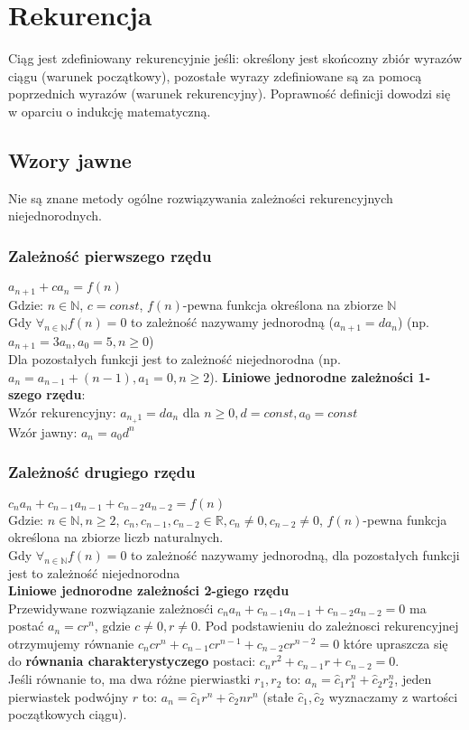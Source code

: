 \documentclass[a4paper,12pt]{article}
\begin{document}
\section{Rekurencja}
Ciąg jest zdefiniowany rekurencyjnie jeśli: określony jest skońcozny zbiór wyrazów ciągu (warunek początkowy), pozostałe wyrazy zdefiniowane są za pomocą poprzednich wyrazów (warunek rekurencyjny). Poprawność definicji dowodzi się w oparciu o indukcję matematyczną.
\subsection{Wzory jawne}
Nie są znane metody ogólne rozwiązywania zależności rekurencyjnych niejednorodnych.
\subsubsection{Zależność pierwszego rzędu}
$a_{n+1}+ca_n=f(n)$ \\
Gdzie: $n\in\mathbb{N}$, $c=const$, $f(n)$-pewna funkcja określona na zbiorze $\mathbb{N}$\\
Gdy $\forall_{n \in\mathbb{N}}f(n)=0$ to zależność nazywamy jednorodną ($a_{n+1}=da_n$) (np. $a_{n+1}=3a_n,  a_0=5, n\geq0$) \\
Dla pozostałych funkcji jest to zależność niejednorodna (np. $a_n=a_{n-1}+(n-1), a_1=0, n\geq2$).
\textbf{Liniowe jednorodne zależności 1-szego rzędu}: \\
Wzór rekurencyjny: $a_{n_+1}=da_n$ dla $n\geq0, d=const, a_0=const$ \\
Wzór jawny: $a_n=a_0d^n$
\subsubsection{Zależność drugiego rzędu}
$c_na_n+c_{n-1}a_{n-1}+c_{n-2}a_{n-2}=f(n)$\\
Gdzie: $n\in\mathbb{N}, n\geq2$, $c_n,c_{n-1}, c_{n-2}\in\mathbb{R}, c_n\neq0, c_{n-2}\neq0$, $f(n)$-pewna funkcja określona na zbiorze liczb naturalnych.\\
Gdy $\forall_{n \in\mathbb{N}}f(n)=0$ to zależność nazywamy jednorodną, dla pozostałych funkcji  jest to zależność niejednorodna \\
\textbf{Liniowe jednorodne zależności 2-giego rzędu}\\
Przewidywane rozwiązanie zależnosći $c_na_n+c_{n-1}a_{n-1}+c_{n-2}a_{n-2}=0$ ma postać $a_n=cr^n$, gdzie $c\neq0, r\neq0$. Pod podstawieniu do zależnosci rekurencyjnej otrzymujemy równanie $c_ncr^n+c_{n-1}cr^{n-1}+c_{n-2}cr^{n-2}=0$ które upraszcza się do \textbf{równania charakterystyczego} postaci: $c_nr^2+c_{n-1}r+c_{n-2}=0$.\\
Jeśli równanie to, ma dwa różne pierwiastki $r_1, r_2$ to: $a_n=\hat c_1r_1^n+\hat c_2r_2^n$, jeden pierwiastek podwójny $r$ to: $a_n=\hat c_1r^n+\hat c_2nr^n$ (stałe $\hat c_1, \hat c_2$ wyznaczamy z wartości początkowych ciągu).
\end{document}
